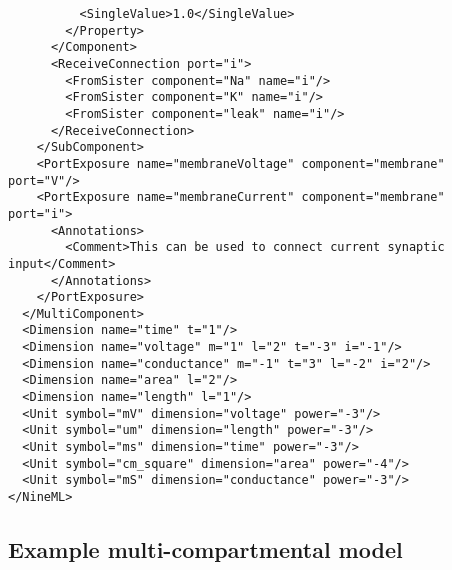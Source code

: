 \documentclass[draftspec]{ninemlspec}
\begin{document}
\begin{lstlisting}
          <SingleValue>1.0</SingleValue>
        </Property>
      </Component>
      <ReceiveConnection port="i">
        <FromSister component="Na" name="i"/>
        <FromSister component="K" name="i"/>
        <FromSister component="leak" name="i"/>
      </ReceiveConnection>
    </SubComponent>
    <PortExposure name="membraneVoltage" component="membrane" port="V"/>
    <PortExposure name="membraneCurrent" component="membrane" port="i">
      <Annotations>
        <Comment>This can be used to connect current synaptic input</Comment>
      </Annotations>
    </PortExposure>
  </MultiComponent>
  <Dimension name="time" t="1"/>
  <Dimension name="voltage" m="1" l="2" t="-3" i="-1"/>
  <Dimension name="conductance" m="-1" t="3" l="-2" i="2"/>
  <Dimension name="area" l="2"/>
  <Dimension name="length" l="1"/>
  <Unit symbol="mV" dimension="voltage" power="-3"/>
  <Unit symbol="um" dimension="length" power="-3"/>
  <Unit symbol="ms" dimension="time" power="-3"/>
  <Unit symbol="cm_square" dimension="area" power="-4"/>
  <Unit symbol="mS" dimension="conductance" power="-3"/>  
</NineML>\end{lstlisting}

\clearpage
\subsection{Example multi-compartmental model}
\end{document}
